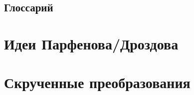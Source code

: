 \documentclass[12pt, a4paper]{report}
\theoremstyle{note}
\begin{document}
\tableofcontents


\newpage
\section{Глоссарий}



\newpage
\chapter{Идеи Парфенова/Дроздова}



\newpage
\chapter{Скрученные преобразования}

\newpage
\printbibliography
\end{document}
